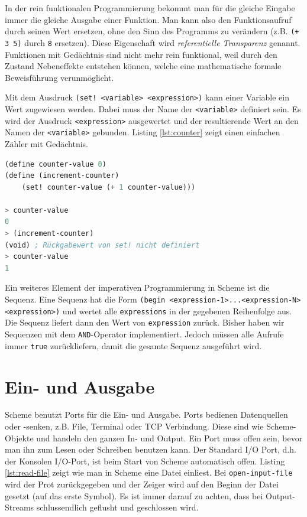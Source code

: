In der rein funktionalen Programmierung bekommt man für die gleiche Eingabe immer die gleiche Ausgabe einer Funktion. Man kann also den Funktionsaufruf durch seinen Wert ersetzen, ohne den Sinn des Programms zu verändern (z.B. \verb|(+ 3 5)| durch \verb|8| ersetzen). Diese Eigenschaft wird \textit{referentielle Transparenz} genannt. Funktionen mit Gedächtnis sind nicht mehr rein funktional, weil durch den Zustand Nebeneffekte entstehen können, welche eine mathematische formale Beweisführung verunmöglicht.

Mit dem Ausdruck \verb|(set! <variable> <expression>)| kann einer Variable ein Wert zugewiesen werden. Dabei muss der Name der \verb|<variable>| definiert sein. Es wird der Ausdruck \verb|<expression>| ausgewertet und der resultierende Wert an den Namen der \verb|<variable>| gebunden. Listing \ref{lst:counter} zeigt einen einfachen Zähler mit Gedächtnis.

\begin{lstlisting}[language=Lisp, caption=Zähler mit Gedächtnis, label=lst:counter]
(define counter-value 0)
(define (increment-counter)
	(set! counter-value (+ 1 counter-value)))
	
> counter-value
0
> (increment-counter)
(void) ; Rückgabewert von set! nicht definiert
> counter-value
1
\end{lstlisting}

Ein weiteres Element der imperativen Programmierung in Scheme ist die Sequenz. Eine Sequenz hat die Form \verb|(begin <expression-1>...<expression-N> <expression>)| und wertet alle \verb|expressions| in der gegebenen Reihenfolge aus. Die Sequenz liefert dann den Wert von \verb|expression| zurück. Bisher haben wir Sequenzen mit dem \verb|AND|-Operator implementiert. Jedoch müssen alle Aufrufe immer \verb|true| zurückliefern, damit die gesamte Sequenz ausgeführt wird.

\section{Ein- und Ausgabe}

Scheme benutzt Ports für die Ein- und Ausgabe. Ports bedienen Datenquellen oder -senken, z.B. File, Terminal oder TCP Verbindung. Diese sind wie Scheme-Objekte und handeln den ganzen In- und Output. Ein Port muss offen sein, bevor man ihn zum Lesen oder Schreiben benutzen kann. Der Standard I/O Port, d.h. der Konsolen I/O-Port, ist beim Start von Scheme automatisch offen. Listing \ref{lst:read-file} zeigt wie man in Scheme eine Datei einliest. Bei \verb|open-input-file| wird der Prot zurückgegeben und der Zeiger wird auf den Beginn der Datei gesetzt (auf das erste Symbol). Es ist immer darauf zu achten, dass bei Output-Streams schlussendlich geflusht und geschlossen wird.

